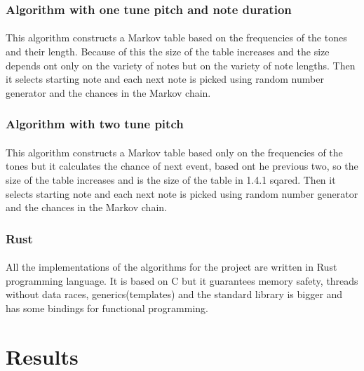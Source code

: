 \documentclass[]{article}
\begin{document}
            \subsubsection{Algorithm with one tune pitch and note duration}
            \paragraph{}This algorithm constructs a Markov table based on the frequencies of the tones and their length. Because of this the size of the table increases and the size depends ont only on the variety of notes but on the variety of note lengths. Then it selects starting note and each next note is picked using random number generator and the chances in the Markov chain.
            \subsubsection{Algorithm with two tune pitch}
            \paragraph{}This algorithm constructs a Markov table based only on the frequencies of the tones but it calculates the chance of next event, based ont he previous two, so the size of the table increases and is the size of the table in 1.4.1 sqared. Then it selects starting note and each next note is picked using random number generator and the chances in the Markov chain.
            \subsubsection{Rust}
            \paragraph{}All the implementations of the algorithms for the project are written in Rust programming language. It is based on C but it guarantees memory safety, threads without data races, generics(templates) and the standard library is bigger and has some bindings for functional programming.
    \section{Results}
\end{document}
